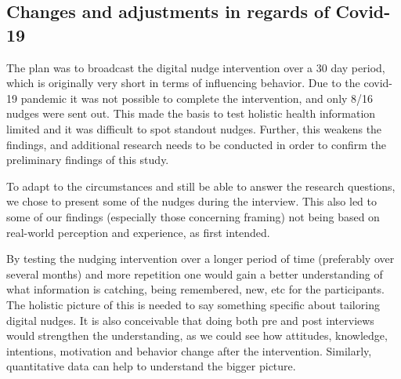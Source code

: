 \subsection{Changes and adjustments in regards of Covid-19 }
The plan was to broadcast the digital nudge intervention over a 30 day period, which is originally very short in terms of influencing behavior. Due to the covid-19 pandemic it was not possible to complete the intervention, and only 8/16 nudges were sent out. This made the basis to test holistic health information limited and it was difficult to spot standout nudges. Further, this weakens the findings, and additional research needs to be conducted in order to confirm the preliminary findings of this study. 

To adapt to the circumstances and still be able to answer the research questions, we chose to present some of the nudges during the interview. This also led to some of our findings (especially those concerning framing) not being based on real-world perception and experience, as first intended. 

By testing the nudging intervention over a longer period of time (preferably over several months) and more repetition one would gain a better understanding of what information is catching, being remembered, new, etc for the participants. The holistic picture of this is needed to say something specific about tailoring digital nudges. It is also conceivable that doing both pre and post interviews would strengthen the understanding, as we could see how attitudes, knowledge, intentions, motivation and behavior change after the intervention. Similarly, quantitative data can help to understand the bigger picture. 


